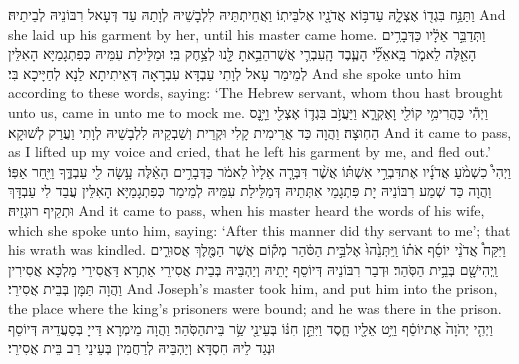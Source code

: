 {וַתַּנַּ֥ח בִּגְד֖וֹ אֶצְלָ֑הּ עַד\maqqaf בּ֥וֹא אֲדֹנָ֖יו אֶל\maqqaf בֵּיתֽוֹ׃}
{וַאֲחֵיתְתֵּיהּ לִלְבָשֵׁיהּ לְוָתַהּ עַד דְּעָאל רִבּוֹנֵיהּ לְבֵיתֵיהּ׃}
{And she laid up his garment by her, until his master came home.}{}
{וַתְּדַבֵּ֣ר אֵלָ֔יו כַּדְּבָרִ֥ים הָאֵ֖לֶּה לֵאמֹ֑ר בָּֽא\maqqaf אֵלַ֞י הָעֶ֧בֶד הָֽעִבְרִ֛י אֲשֶׁר\maqqaf הֵבֵ֥אתָ לָּ֖נוּ לְצַ֥חֶק בִּֽי׃}
{וּמַלֵּילַת עִמֵּיהּ כְּפִתְגָמַיָּא הָאִלֵּין לְמֵימַר עָאל לְוָתִי עַבְדָּא עִבְרָאָה דְּאֵיתִיתָא לַנָא לְחַיָּיכָא בִּי׃}
{And she spoke unto him according to these words, saying: ‘The Hebrew servant, whom thou hast brought unto us, came in unto me to mock me.}{}
{וַיְהִ֕י כַּהֲרִימִ֥י קוֹלִ֖י וָאֶקְרָ֑א וַיַּעֲזֹ֥ב בִּגְד֛וֹ אֶצְלִ֖י וַיָּ֥נׇס הַחֽוּצָה׃}
{וַהֲוָה כַּד אֲרֵימִית קָלִי וּקְרֵית וְשַׁבְקֵיהּ לִלְבָשֵׁיהּ לְוָתִי וַעֲרַק לְשׁוּקָא׃}
{And it came to pass, as I lifted up my voice and cried, that he left his garment by me, and fled out.’}{}
{וַיְהִי֩ כִשְׁמֹ֨עַ אֲדֹנָ֜יו אֶת\maqqaf דִּבְרֵ֣י אִשְׁתּ֗וֹ אֲשֶׁ֨ר דִּבְּרָ֤ה אֵלָיו֙ לֵאמֹ֔ר כַּדְּבָרִ֣ים הָאֵ֔לֶּה עָ֥שָׂה לִ֖י עַבְדֶּ֑ךָ וַיִּ֖חַר אַפּֽוֹ׃}
{וַהֲוָה כַּד שְׁמַע רִבּוֹנֵיהּ יָת פִּתְגָמֵי אִתְּתֵיהּ דְּמַלֵּילַת עִמֵּיהּ לְמֵימַר כְּפִתְגָמַיָּא הָאִלֵּין עֲבַד לִי עַבְדָּךְ וּתְקֵיף רוּגְזֵיהּ׃}
{And it came to pass, when his master heard the words of his wife, which she spoke unto him, saying: ‘After this manner did thy servant to me’; that his wrath was kindled.}{}
{וַיִּקַּח֩ אֲדֹנֵ֨י יוֹסֵ֜ף אֹת֗וֹ וַֽיִּתְּנֵ֙הוּ֙ אֶל\maqqaf בֵּ֣ית הַסֹּ֔הַר מְק֕וֹם אֲשֶׁר\maqqaf {} הַמֶּ֖לֶךְ אֲסוּרִ֑ים וַֽיְהִי\maqqaf שָׁ֖ם בְּבֵ֥ית הַסֹּֽהַר׃}
{וּדְבַר רִבּוֹנֵיהּ דְּיוֹסֵף יָתֵיהּ וְיַהְבֵּיהּ בְּבֵית אֲסִירֵי אַתְרָא דַּאֲסִירֵי מַלְכָּא אֲסִירִין וַהֲוָה תַּמָּן בְּבֵית אֲסִירֵי׃}
{And Joseph’s master took him, and put him into the prison, the place where the king’s prisoners were bound; and he was there in the prison.}{}
{וַיְהִ֤י יְהֹוָה֙ אֶת\maqqaf יוֹסֵ֔ף וַיֵּ֥ט אֵלָ֖יו חָ֑סֶד וַיִּתֵּ֣ן חִנּ֔וֹ בְּעֵינֵ֖י שַׂ֥ר בֵּית\maqqaf הַסֹּֽהַר׃}
{וַהֲוָה מֵימְרָא דַּייָ בְּסַעֲדֵיהּ דְּיוֹסֵף וּנְגַד לֵיהּ חִסְדָּא וְיַהְבֵּיהּ לְרַחֲמִין בְּעֵינֵי רַב בֵּית אֲסִירֵי׃}
